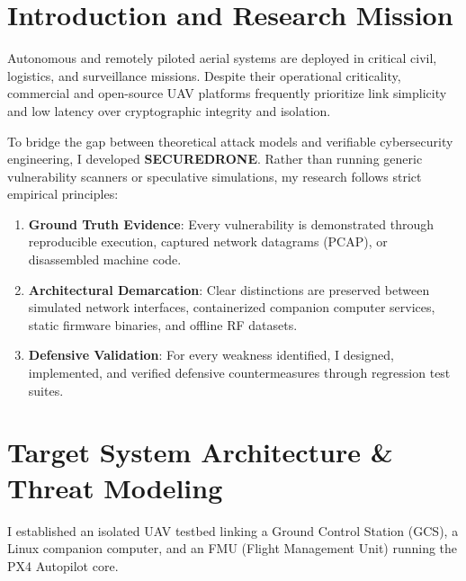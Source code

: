 \documentclass[11pt,a4paper]{article}
\begin{document}
\section{Introduction and Research Mission}
Autonomous and remotely piloted aerial systems are deployed in critical civil, logistics, and surveillance missions. Despite their operational criticality, commercial and open-source UAV platforms frequently prioritize link simplicity and low latency over cryptographic integrity and isolation.

To bridge the gap between theoretical attack models and verifiable cybersecurity engineering, I developed \textbf{SECUREDRONE}. Rather than running generic vulnerability scanners or speculative simulations, my research follows strict empirical principles:
\begin{enumerate}
    \item \textbf{Ground Truth Evidence}: Every vulnerability is demonstrated through reproducible execution, captured network datagrams (PCAP), or disassembled machine code.
    \item \textbf{Architectural Demarcation}: Clear distinctions are preserved between simulated network interfaces, containerized companion computer services, static firmware binaries, and offline RF datasets.
    \item \textbf{Defensive Validation}: For every weakness identified, I designed, implemented, and verified defensive countermeasures through regression test suites.
\end{enumerate}

\section{Target System Architecture \& Threat Modeling}
I established an isolated UAV testbed linking a Ground Control Station (GCS), a Linux companion computer, and an FMU (Flight Management Unit) running the PX4 Autopilot core.
\end{document}
